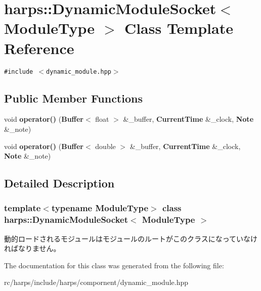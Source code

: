 \section{harps::DynamicModuleSocket$<$ ModuleType $>$ Class Template Reference}
\label{classharps_1_1DynamicModuleSocket}
{\tt \#include $<$dynamic\_\-module.hpp$>$}

\subsection*{Public Member Functions}
\begin{CompactItemize}
\item 
void \textbf{operator()} ({\bf Buffer}$<$ float $>$ \&\_\-buffer, {\bf CurrentTime} \&\_\-clock, {\bf Note} \&\_\-note)\label{classharps_1_1DynamicModuleSocket_a127ba795c508bf5981cb2d6fab79f07}

\item 
void \textbf{operator()} ({\bf Buffer}$<$ double $>$ \&\_\-buffer, {\bf CurrentTime} \&\_\-clock, {\bf Note} \&\_\-note)\label{classharps_1_1DynamicModuleSocket_87cba2d094ec5fc6b6d1f20502158829}

\end{CompactItemize}


\subsection{Detailed Description}
\subsubsection*{template$<$typename ModuleType$>$ class harps::DynamicModuleSocket$<$ ModuleType $>$}

動的ロードされるモジュールはモジュールのルートがこのクラスになっていなければなりません。 

The documentation for this class was generated from the following file:\begin{CompactItemize}
\item 
rc/harps/include/harps/compornent/dynamic\_\-module.hpp\end{CompactItemize}
